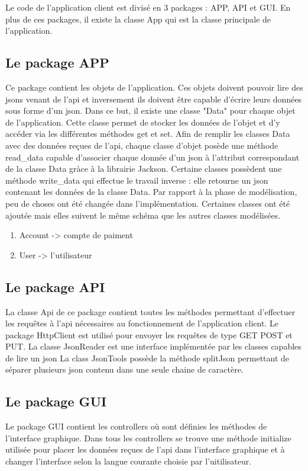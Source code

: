\documentclass[../rapport.tex]{subfiles}
\begin{document}
Le code de l'application client est divisé en 3 packages : APP, API et GUI.
En plus de ces packages, il existe la classe App qui est la classe principale de l'application. 

\subsection{Le package APP}
Ce package contient les objets de l'application. Ces objets doivent pouvoir lire des jsons venant de l'api et inversement ils doivent être capable
d'écrire leurs données sous forme d'un json. Dans ce but, il existe une classe "Data" pour chaque objet de l'application. Cette classe permet de stocker 
les données de l'objet et d'y accéder via les différentes méthodes get et set. 
Afin de remplir les classes Data avec des données reçues de l'api, chaque classe d'objet posède une méthode read_data capable d'associer
chaque donnée d'un json à l'attribut correspondant de la classe Data gràce à la librairie Jackson.  
Certaine classes possèdent une méthode write_data qui effectue le travail inverse : elle retourne un json contenant les données de la classe Data.
Par rapport à la phase de modélisation, peu de choses ont été changée dans l'implémentation. Certaines classes ont été ajoutée mais elles suivent le même schéma que 
les autres classes modélisées.

\begin{enumerate}
\item Account -> compte de paiment
\item User -> l'utilisateur
\end{enumerate}

\subsection{Le package API}
La classe Api de ce package contient toutes les méthodes permettant d'effectuer les requêtes à l'api nécessaires au fonctionnement de l'application client.
Le package HttpClient est utilisé pour envoyer les requêtes de type GET POST et PUT.
La classe JsonReader est une interface implémentée par les classes capables de lire un json
La class JsonTools possède la méthode splitJson permettant de séparer plusieurs json contenu dans une seule chaine de caractère.

\subsection{Le package GUI}
Le package GUI contient les controllers où sont définies les méthodes de l'interface graphique. 
Dans tous les controllers se trouve une méthode initialize utilisée pour placer les données reçues de l'api dans l'interface graphique et à changer l'interface
selon la langue courante choisie par l'uitilisateur.
\end{document}
